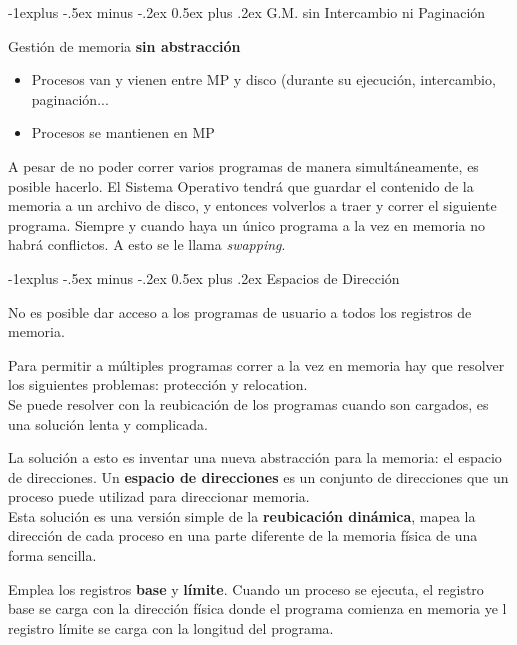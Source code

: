 \documentclass[10pt,portrait, twocolumn]{article}
\makeatletter
\renewcommand{\subsection}{\@startsection{subsection}{2}{0mm}%
                                {-1explus -.5ex minus -.2ex}%
                                {0.5ex plus .2ex}%
                                {\normalfont\normalsize\bfseries}}
\makeatother
\begin{document}
\subsection{G.M. sin Intercambio ni Paginación}

Gestión de memoria \textbf{sin abstracción}

	\begin{itemize}
	\item Procesos van y vienen entre MP y disco (durante su ejecución, intercambio, paginación...
	\item Procesos se mantienen en MP
	\end{itemize}
	
A pesar de no poder correr varios programas de manera simultáneamente, es posible hacerlo. El Sistema Operativo tendrá que guardar el contenido de la memoria a un archivo de disco, y entonces volverlos a traer y correr el siguiente programa. Siempre y cuando haya un único programa a la vez en memoria no habrá conflictos. A esto se le llama \textit{swapping}.

\subsection{Espacios de Dirección}

No es posible dar acceso a los programas de usuario a todos los registros de memoria.

	\quad Para permitir a múltiples programas correr a la vez en memoria hay que resolver los siguientes problemas: protección y relocation.\\
	
Se puede resolver con la reubicación de los programas cuando son cargados, es una solución lenta y complicada.
	
	\quad La solución a esto es inventar una nueva abstracción para la memoria: el espacio de direcciones. Un \textbf{espacio de direcciones} es un conjunto de direcciones que un proceso puede utilizad para direccionar memoria. \\
	
Esta solución es una versión simple de la \textbf{reubicación dinámica}, mapea la dirección de cada proceso en una parte diferente de la memoria física de una forma sencilla.

	\quad Emplea los registros \textbf{base} y \textbf{límite}. Cuando un proceso se ejecuta, el registro base se carga con la dirección física donde el programa comienza en memoria ye l registro límite se carga con la longitud del programa.\\
	
\end{document}
